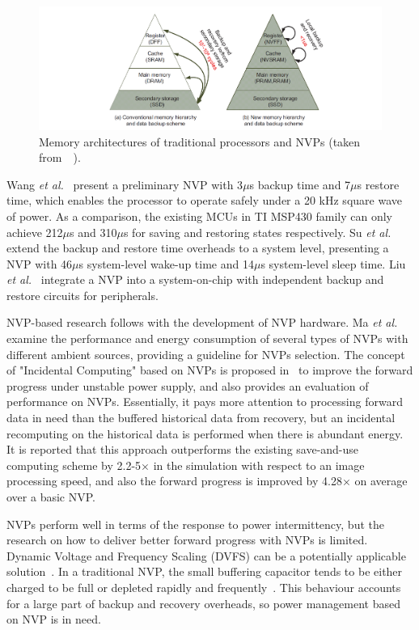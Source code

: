 \begin{figure}
    \centering
    \includegraphics[width=\columnwidth]{ch2_review/figures/nvp}
    \caption{Memory architectures of traditional processors and NVPs (taken from~\cite{liu2015ambient}~).}
    \label{Figure:nvp}
\end{figure}

Wang \textit{et al.}~\cite{wang20123us} present a preliminary NVP with 3$\mu$s backup time and 7$\mu$s restore time, which enables the processor to operate safely under a 20 kHz square wave of power. As a comparison, the existing MCUs in TI MSP430 family can only achieve 212$\mu$s and 310$\mu$s for saving and restoring states respectively. Su \textit{et al.}~\cite{su2017ferroelectric} extend the backup and restore time overheads to a system level, presenting a NVP with 46$\mu$s system-level wake-up time and 14$\mu$s system-level sleep time. Liu \textit{et al.}~\cite{liu2019130} integrate a NVP into a system-on-chip with independent backup and restore circuits for peripherals. 

NVP-based research follows with the development of NVP hardware. Ma \textit{et al.}~\cite{ma2015architecture} examine the performance and energy consumption of several types of NVPs with different ambient sources, providing a guideline for NVPs selection. The concept of "Incidental Computing" based on NVPs is proposed in~\cite{ma2017incidental} to improve the forward progress under unstable power supply, and also provides an evaluation of performance on NVPs. Essentially, it pays more attention to processing forward data in need than the buffered historical data from recovery, but an incidental recomputing on the historical data is performed when there is abundant energy. It is reported that this approach outperforms the existing save-and-use computing scheme by 2.2-5$\times$ in the simulation with respect to an image processing speed, and also the forward progress is improved by 4.28$\times$ on average over a basic NVP.

NVPs perform well in terms of the response to power intermittency, but the research on how to deliver better forward progress with NVPs is limited. Dynamic Voltage and Frequency Scaling (DVFS) can be a potentially applicable solution~\cite{ma2016nonvolatile}. In a traditional NVP, the small buffering capacitor tends to be either charged to be full or depleted rapidly and frequently~\cite{su2017nonvolatile}. This behaviour accounts for a large part of backup and recovery overheads, so power management based on NVP is in need.

